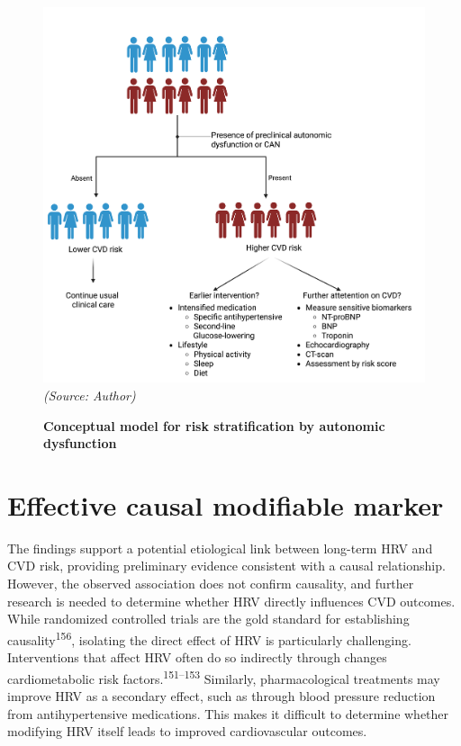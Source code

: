 \documentclass[
  a4paper,
  headsepline=true,
  open=left]{scrbook}
\begin{document}
\begin{figure}

{\centering 

\includegraphics{images/strafication_tree_of_CAN(1).png}\\
\emph{(Source: Author)}

}

\caption{\label{fig-rsp}\textbf{Conceptual model for risk stratification
by autonomic dysfunction}}

\end{figure}

\hypertarget{effective-causal-modifiable-marker}{%
\section{Effective causal modifiable
marker}\label{effective-causal-modifiable-marker}}

The findings support a potential etiological link between long-term HRV
and CVD risk, providing preliminary evidence consistent with a causal
relationship. However, the observed association does not confirm
causality, and further research is needed to determine whether HRV
directly influences CVD outcomes. While randomized controlled trials are
the gold standard for establishing causality\textsuperscript{156},
isolating the direct effect of HRV is particularly challenging.
Interventions that affect HRV often do so indirectly through changes
cardiometabolic risk factors.\textsuperscript{151--153} Similarly,
pharmacological treatments may improve HRV as a secondary effect, such
as through blood pressure reduction from antihypertensive medications.
This makes it difficult to determine whether modifying HRV itself leads
to improved cardiovascular outcomes.
\end{document}
